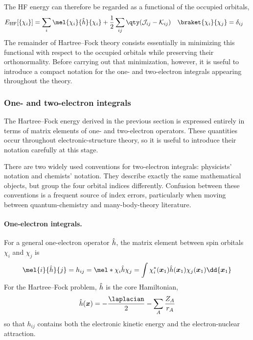 \documentclass[11pt,a4paper,titlepage]{article}
\numberwithin{equation}{section}
\newcommand{\EHF}{E_\text{HF}}
\newcommand{\bx}{\boldsymbol{x}}
\newcommand{\hh}{\Hat{h}}
\newcommand{\cJ}{\mathcal{J}}
\newcommand{\cK}{\mathcal{K}}
\begin{document}
The HF energy can therefore be regarded as a functional of the occupied
orbitals,
\begin{align}
  \EHF[\{\chi_i\}]
  & =
  \sum_i
  \mel{\chi_i}{\hh}{\chi_i}
  +
  \frac{1}{2}
  \sum_{ij}
  \qty(
    \cJ_{ij}-\cK_{ij}
  )
  &
  \braket{\chi_i}{\chi_j}& =\delta_{ij}
  \label{eq:hf-energy-functional}
\end{align}
The remainder of Hartree--Fock theory consists essentially in minimizing this
functional with respect to the occupied orbitals while preserving their
orthonormality. Before carrying out that minimization, however, it is useful
to introduce a compact notation for the one- and two-electron integrals
appearing throughout the theory.

\subsubsection{One- and two-electron integrals}

The Hartree--Fock energy derived in the previous section is expressed entirely
in terms of matrix elements of one- and two-electron operators. These
quantities occur throughout electronic-structure theory, so it is useful to
introduce their notation carefully at this stage.

There are two widely used conventions for two-electron integrals:
physicists' notation and chemists' notation. They describe
exactly the same mathematical objects, but group the four orbital indices
differently. Confusion between these conventions is a frequent source of
index errors, particularly when moving between quantum-chemistry and
many-body-theory literature.

\paragraph{One-electron integrals.}

For a general one-electron operator $\hh$, the matrix element between spin
orbitals $\chi_i$ and $\chi_j$ is
\begin{equation}
  \mel{i}{\hh}{j}
  =
  h_{ij}
  =
  \mel*{\chi_i}{\hh}{\chi_j}
  =
  \int
  \chi_i^*(\bx_1)
  \hh(\bx_1)
  \chi_j(\bx_1)
  \dd{\bx_1}
  \label{eq:one-electron-integral}
\end{equation}
For the Hartree--Fock problem, $\hh$ is the core Hamiltonian,
\begin{equation}
  \hh(\bx)
  =
  -\frac{\laplacian}{2}
  -
  \sum_A\frac{Z_A}{r_A}
\end{equation}
so that $h_{ij}$ contains both the electronic kinetic energy and the
electron-nuclear attraction.
\end{document}

